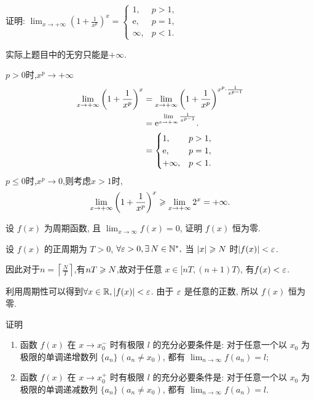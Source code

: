 \begin{exercise}[1.C.13]
    证明: $\lim_{x \to +\infty} \left(1+\frac{1}{x^p}\right)^x = \begin{cases} 1, & p > 1, \\ \mathrm{e}, & p = 1, \\ \infty, & p < 1. \end{cases}$
\end{exercise}
\begin{solution}
    实际上题目中的无穷只能是$+\infty$.

    $p>0$时,$x^p\to+\infty$
    \begin{align*}
        \lim_{x \to +\infty} \left(1+\frac{1}{x^p}\right)^x &= \lim_{x \to +\infty} \left(1+\frac{1}{x^p}\right)^{x^p\cdot\frac{1}{x^{p-1}}} \\
        &= \mathrm{e}^{\lim\limits_{x \to +\infty}\frac{1}{x^{p-1}}}.\\
        &= \begin{cases} 1, & p > 1, \\ 
        \mathrm{e}, & p = 1, \\ +\infty, & p < 1. \end{cases}
    \end{align*}
    $p\le0$时,$x^p\to 0$,则考虑$x>1$时,
    $$\lim_{x \to +\infty} \left(1+\frac{1}{x^p}\right)^x\geqslant\lim_{x \to +\infty}  2^x=+\infty.$$
\end{solution}
\begin{exercise}[1.C.14]
    设 $f(x)$ 为周期函数, 且 $\lim_{x \to \infty} f(x) = 0$, 证明 $f(x)$ 恒为零.
\end{exercise}
\begin{solution}
    设 $f(x)$ 的正周期为 $T>0$, $\forall \ve >0,\exists N \in \N^*,$ 当 $|x|\geqslant N$ 时$|f(x)|<\varepsilon$.
    
    因此对于$n=\left\lceil \frac{N}{T}\right\rceil$,有$nT\geqslant N$,故对于任意 $x \in [nT, (n+1)T)$, 有$f(x)<\varepsilon$.
    
    利用周期性可以得到$\forall x \in \mathbb{R}, |f(x)| < \varepsilon$.
    由于 $\varepsilon$ 是任意的正数, 所以 $f(x)$ 恒为零.
\end{solution}

\begin{exercise}[1.C.15]
    证明
    \begin{enumerate}
        \item 函数 $f(x)$ 在 $x \to x_0^-$ 时有极限 $l$ 的充分必要条件是: 对于任意一个以 $x_0$ 为极限的单调递增数列 $\{a_n\} \, (a_n \ne x_0)$, 都有 $\lim_{n \to \infty} f(a_n) = l$;
        \item 函数 $f(x)$ 在 $x \to x_0^+$ 时有极限 $l$ 的充分必要条件是: 对于任意一个以 $x_0$ 为极限的单调递减数列 $\{a_n\} \, (a_n \ne x_0)$, 都有 $\lim_{n \to \infty} f(a_n) = l$.
    \end{enumerate}
\end{exercise}

